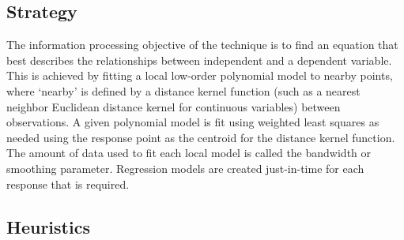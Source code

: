 \subsection{Strategy}
The information processing objective of the technique is to find an equation that best describes the relationships between independent and a dependent variable.
This is achieved by fitting a local low-order polynomial model to nearby points, where `nearby' is defined by a distance kernel function (such as a nearest neighbor Euclidean distance kernel for continuous variables) between observations. A given polynomial model is fit using weighted least squares as needed using the response point as the centroid for the distance kernel function. The amount of data used to fit each local model is called the bandwidth or smoothing parameter. Regression models are created just-in-time for each response that is required.

\subsection{Heuristics}

